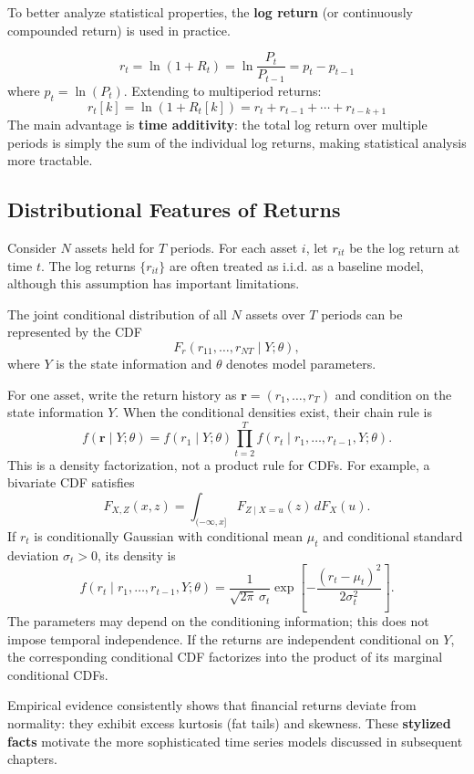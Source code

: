 To better analyze statistical properties, the \textbf{log return} (or continuously compounded return) is used in practice.

\begin{definition}
$$r_t = \ln(1 + R_t) = \ln\frac{P_t}{P_{t-1}} = p_t - p_{t-1}$$
where $p_t = \ln(P_t)$. Extending to multiperiod returns:
$$r_t[k] = \ln(1 + R_t[k]) = r_t + r_{t-1} + \cdots + r_{t-k+1}$$
The main advantage is \textbf{time additivity}: the total log return over multiple periods is simply the sum of the individual log returns, making statistical analysis more tractable.
\end{definition}
\subsection{Distributional Features of Returns}

Consider $N$ assets held for $T$ periods. For each asset $i$, let $r_{it}$ be the log return at time $t$. The log returns $\{r_{it}\}$ are often treated as i.i.d. as a baseline model, although this assumption has important limitations.

The joint conditional distribution of all $N$ assets over $T$ periods
can be represented by the CDF
\[
F_r(r_{11},\ldots,r_{NT}\mid Y;\theta),
\]
where $Y$ is the state information and $\theta$ denotes model parameters.

For one asset, write the return history as
$\mathbf r=(r_1,\ldots,r_T)$ and condition on the state information $Y$.
When the conditional densities exist, their chain rule is
\[
f(\mathbf r\mid Y;\theta)=f(r_1\mid Y;\theta)
\prod_{t=2}^T f(r_t\mid r_1,\ldots,r_{t-1},Y;\theta).
\]
This is a density factorization, not a product rule for CDFs. For
example, a bivariate CDF satisfies
\[
F_{X,Z}(x,z)=\int_{(-\infty,x]}F_{Z\mid X=u}(z)\,dF_X(u).
\]
If $r_t$ is conditionally Gaussian with conditional mean $\mu_t$ and
conditional standard deviation $\sigma_t>0$, its density is
\[
f(r_t\mid r_1,\ldots,r_{t-1},Y;\theta)
=\frac{1}{\sqrt{2\pi}\,\sigma_t}
\exp\!\left[-\frac{(r_t-\mu_t)^2}{2\sigma_t^2}\right].
\]
The parameters may depend on the conditioning information; this does
not impose temporal independence. If the returns are independent
conditional on $Y$, the corresponding conditional CDF factorizes
into the product of its marginal conditional CDFs.

Empirical evidence consistently shows that financial returns deviate from normality: they exhibit excess kurtosis (fat tails) and skewness. These \textbf{stylized facts} motivate the more sophisticated time series models discussed in subsequent chapters.

